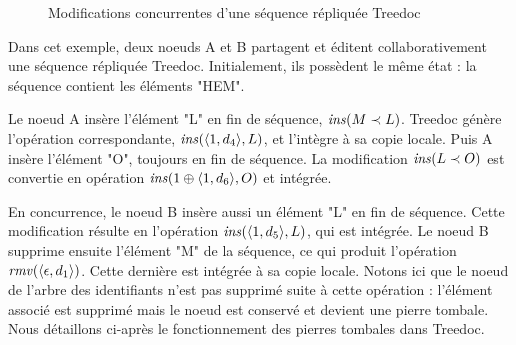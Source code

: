 \begin{figure}[!ht]
{
  }
  \caption{Modifications concurrentes d'une séquence répliquée Treedoc}
  \label{fig:treedoc}
\end{figure}

Dans cet exemple, deux noeuds A et B partagent et éditent collaborativement une séquence répliquée Treedoc.
Initialement, ils possèdent le même état : la séquence contient les éléments "HEM".

Le noeud A insère l'élément "L" en fin de séquence, \ie $\mathit{ins}(M \prec L)$.
Treedoc génère l'opération correspondante, $\mathit{ins}(\langle 1,d_4 \rangle, L)$, et l'intègre à sa copie locale.
Puis A insère l'élément "O", toujours en fin de séquence.
La modification $\mathit{ins}(L \prec O)$ est convertie en opération $\mathit{ins}(1 \oplus \langle 1,d_6 \rangle, O)$ et intégrée.

En concurrence, le noeud B insère aussi un élément "L" en fin de séquence.
Cette modification résulte en l'opération $\mathit{ins}(\langle 1,d_5 \rangle, L)$, qui est intégrée.
Le noeud B supprime ensuite l'élément "M" de la séquence, ce qui produit l'opération $\mathit{rmv}(\langle \epsilon,d_1 \rangle)$.
Cette dernière est intégrée à sa copie locale.
Notons ici que le noeud de l'arbre des identifiants n'est pas supprimé suite à cette opération : l'élément associé est supprimé mais le noeud est conservé et devient une pierre tombale.
Nous détaillons ci-après le fonctionnement des pierres tombales dans Treedoc.


